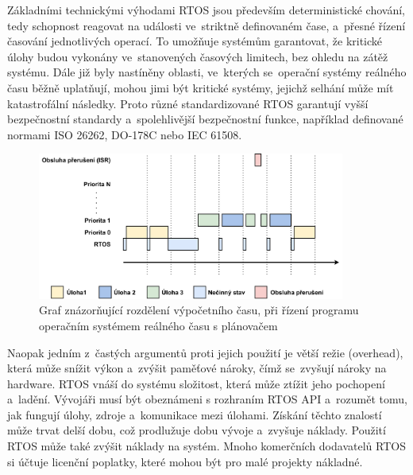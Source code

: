 Základními technickými výhodami RTOS jsou především deterministické chování, tedy schopnost reagovat na události ve~striktně definovaném čase, a~přesné řízení časování jednotlivých operací. To umožňuje systémům garantovat, že kritické úlohy budou vykonány ve~stanovených časových limitech, bez ohledu na zátěž systému. Dále již byly nastíněny oblasti, ve~kterých se~operační systémy reálného času běžně uplatňují, mohou jimi být kritické systémy, jejichž selhání může mít katastrofální následky. Proto různé standardizované RTOS garantují vyšší bezpečnostní standardy a~spolehlivější bezpečnostní funkce, například definované normami ISO 26262, DO-178C nebo IEC 61508.~\cite{freertos_safertos}

\begin{figure}[h]
    \centering
    \includegraphics[width=0.90\textwidth]{obrazky-figures/rtos_scheduling.pdf}
    
    \caption{Graf znázorňující rozdělení výpočetního času, při řízení programu operačním systémem reálného času s plánovačem~\cite{freertos_book}}
    \label{fig:rtos-scheduling}
\end{figure}


Naopak jedním z~častých argumentů proti jejich použití je větší režie (overhead), která může snížit výkon a~zvýšit paměťové nároky, čímž se~zvyšují nároky na hardware. RTOS vnáší do systému složitost, která může ztížit jeho pochopení a~ladění. Vývojáři musí být obeznámeni s rozhraním RTOS API a~rozumět tomu, jak fungují úlohy, zdroje a~komunikace mezi úlohami. Získání těchto znalostí může trvat delší dobu, což prodlužuje dobu vývoje a~zvyšuje náklady. Použití RTOS může také zvýšit náklady na systém. Mnoho komerčních dodavatelů RTOS si účtuje licenční poplatky, které mohou být pro malé projekty nákladné.~\cite{sysgo_baremetal_vs_rtos}

